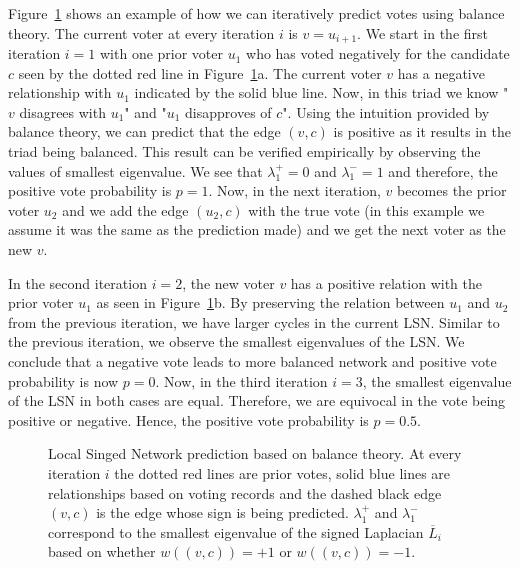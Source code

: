 Figure~\ref{fig:lsn-balance} shows an example of how we can iteratively predict votes using balance theory.
The current voter at every iteration $i$ is $v=u_{i+1}$.
We start in the first iteration $i=1$ with one prior voter $u_1$ who has voted negatively for the candidate $c$ seen by the dotted red line in Figure~\ref{fig:lsn-balance}a.
The current voter $v$ has a negative relationship with $u_1$ indicated by the solid blue line.
Now, in this triad we know "$v$ disagrees with $u_1$" and "$u_1$ disapproves of $c$".
Using the intuition provided by balance theory, we can predict that the edge $(v,c)$ is positive as it results in the triad being balanced.
This result can be verified empirically by observing the values of smallest eigenvalue.
We see that $\lambda_1^+=0$ and $\lambda_1^-=1$ and therefore, the positive vote probability is $p=1$.
Now, in the next iteration, $v$ becomes the prior voter $u_2$ and we add the edge $(u_2,c)$ with the true vote (in this example we assume it was the same as the prediction made) and we get the next voter as the new $v$.

In the second iteration $i=2$, the new voter $v$ has a positive relation with the prior voter $u_1$ as seen in Figure~\ref{fig:lsn-balance}b.
By preserving the relation between $u_1$ and $u_2$ from the previous iteration, we have larger cycles in the current LSN.
Similar to the previous iteration, we observe the smallest eigenvalues of the LSN.
We conclude that a negative vote leads to more balanced network and positive vote probability is now $p=0$.
Now, in the third iteration $i=3$, the smallest eigenvalue of the LSN in both cases are equal.
Therefore, we are equivocal in the vote being positive or negative.
Hence, the positive vote probability is $p=0.5$.

\begin{figure}[!ht]
    \centering
    
    \caption{Local Singed Network prediction based on balance theory. At every iteration $i$ the dotted red lines are prior votes, solid blue lines are relationships based on voting records and the dashed black edge $(v,c)$ is the edge whose sign is being predicted. $\lambda_1^+$ and $\lambda_1^-$ correspond to the smallest eigenvalue of the signed Laplacian $\overline{L}_i$ based on whether $w((v,c))=+1$ or $w((v,c))=-1$.     }
    \label{fig:lsn-balance}
\end{figure}

